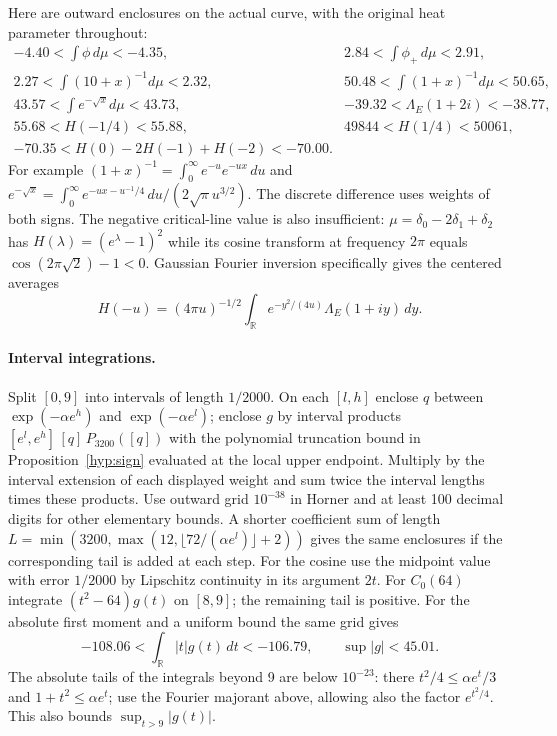 \documentclass[11pt]{article}
\begin{document}
Here are outward enclosures on the actual curve, with the original heat
parameter throughout:
\[
\begin{array}{ll}
-4.40<\int \phi\,d\mu<-4.35,&2.84<\int\phi_+\,d\mu<2.91,\\
2.27<\int (10+x)^{-1}d\mu<2.32,&
50.48<\int (1+x)^{-1}d\mu<50.65,\\
43.57<\int e^{-\sqrt x}d\mu<43.73,&-39.32<\Lambda_E(1+2i)<-38.77,\\
55.68<H(-1/4)<55.88,&49844<H(1/4)<50061,\\
-70.35<H(0)-2H(-1)+H(-2)<-70.00.&
\end{array}
\]
For example $(1+x)^{-1}=\int_0^\infty e^{-u}e^{-ux}\,du$ and
$e^{-\sqrt x}=\int_0^\infty e^{-ux-u^{-1}/4}\,du/(2\sqrt\pi u^{3/2})$.
The discrete difference uses weights of both signs. The negative
critical-line value is also insufficient: $\mu=\delta_0-2\delta_1+\delta_2$
has $H(\lambda)=(e^\lambda-1)^2$ while its cosine transform at frequency
$2\pi$ equals $\cos(2\pi\sqrt2)-1<0$. Gaussian Fourier inversion
specifically gives the centered averages
\[
H(-u)=(4\pi u)^{-1/2}\int_{\mathbb R}e^{-y^2/(4u)}\Lambda_E(1+iy)\,dy.
\]

\paragraph{Interval integrations.}
Split $[0,9]$ into intervals of length $1/2000$.
On each $[l,h]$ enclose $q$ between $\exp(-\alpha e^h)$ and
$\exp(-\alpha e^l)$; enclose $g$ by interval products
$[e^l,e^h]\,[q]\,P_{3200}([q])$ with the polynomial truncation
bound in Proposition~\ref{hyp:sign} evaluated at the local upper
endpoint. Multiply by the interval extension of each displayed
weight and sum twice the interval lengths times these products.
Use outward grid $10^{-38}$ in Horner and at least 100 decimal
digits for other elementary bounds. A shorter coefficient sum of
length $L=\min(3200,\max(12,\lfloor72/(\alpha e^l)\rfloor+2))$
gives the same enclosures if the corresponding tail is added at each
step. For the cosine use the midpoint value with error $1/2000$
by Lipschitz continuity in its argument $2t$.
For $C_0(64)$ integrate $(t^2-64)g(t)$ on $[8,9]$; the remaining
tail is positive. For the absolute first moment and a uniform bound
the same grid gives
\[
-108.06<\int_{\mathbb R}|t|g(t)\,dt<-106.79,\qquad \sup|g|<45.01.
\]
The absolute tails of the integrals beyond 9 are below $10^{-23}$:
there $t^2/4\le\alpha e^t/3$ and $1+t^2\le\alpha e^t$; use the
Fourier majorant above, allowing also the factor $e^{t^2/4}$.
This also bounds $\sup_{t>9}|g(t)|$.
\end{document}
